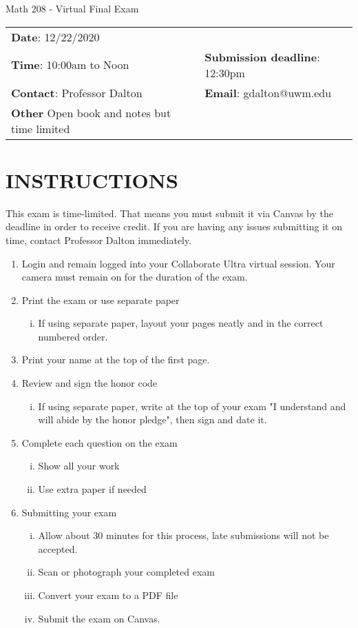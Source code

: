 \documentclass[12pt,letterpaper]{article}
\author{Gary Dalton <gdalton@uwm.edu>}
\begin{document}
	
\begin{center} \LARGE Math 208 - Virtual Final Exam\end{center}%
\smallskip

\begin{center} \begin{tabular}{l l}
		\textbf{Date}: 12/22/2020 \\
		\textbf{Time}: 10:00am to Noon &
		\textbf{Submission deadline}: 12:30pm\\
		\textbf{Contact}: Professor Dalton
		&  \textbf{Email}: gdalton@uwm.edu \\
		\textbf{Other} Open book and notes but time limited
\end{tabular} \end{center}%


\section*{INSTRUCTIONS}
This exam is time-limited. That means you must submit it via Canvas by the deadline in order to receive credit. If you are having any issues submitting it on time, contact Professor Dalton immediately.
\begin{enumerate}
	\item Login and remain logged into your Collaborate Ultra virtual session. Your camera must remain on for the duration of the exam.
	\item Print the exam or use separate paper
	\begin{enumerate}[(i)]
		\item If using separate paper, layout your pages neatly and in the correct numbered order.
	\end{enumerate}
	\item Print your name at the top of the first page.
	\item Review and sign the honor code
	\begin{enumerate}[(i)]
		\item If using separate paper, write at the top of your exam "I understand and will abide by the honor pledge", then sign and date it.
	\end{enumerate}
	\item Complete each question on the exam
	\begin{enumerate}[(i)]
		\item Show all your work
		\item Use extra paper if needed
	\end{enumerate}
	\item Submitting your exam
	\begin{enumerate}[(i)]
		\item Allow about 30 minutes for this process, late submissions will not be accepted.
		\item Scan or photograph your completed exam
		\item Convert your exam to a PDF file
		\item Submit the exam on Canvas.
	\end{enumerate}
\end{enumerate}
\end{document}
